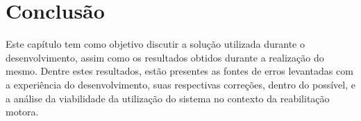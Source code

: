 \chapter[Conclusão]{Conclusão}\label{ch:conclusao}
  Este capítulo tem como objetivo discutir a solução utilizada durante o
desenvolvimento, assim como os resultados obtidos durante a realização do mesmo. Dentre estes
resultados, estão presentes as fontes de erros levantadas com a experiência do desenvolvimento,
suas respectivas correções, dentro do possível, e a análise da viabilidade da utilização do
sistema no contexto da reabilitação motora.
